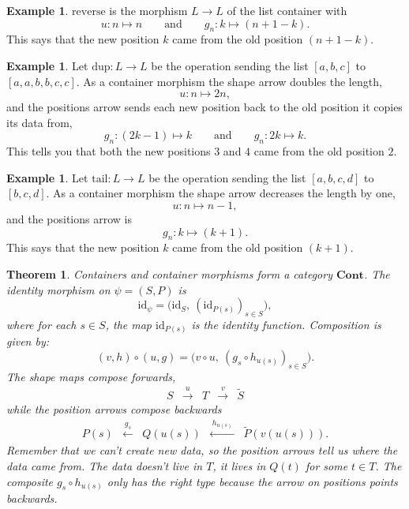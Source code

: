 \documentclass[11pt, a4paper]{article}
\theoremstyle{definition}
\newtheorem{example}[definition]{Example}
\theoremstyle{plain}
\newtheorem{theorem}[definition]{Theorem}
\begin{document}
\begin{example}\label{ex:reverse}
$\mathrm{reverse}$ is the morphism $L \to L$ of the list container with
\[
  u : n \mapsto n
  \qquad\text{and}\qquad
  g_n : k \mapsto (n + 1 - k).
\]
This says that the new position $k$ came from the old position
$(n + 1 - k)$.
\end{example}

\begin{example}\label{ex:dup}
Let $\mathrm{dup} : L \to L$ be the operation sending the list
$[a, b, c]$ to $[a, a, b, b, c, c]$.  As a container morphism the
shape arrow doubles the length,
\[
  u : n \mapsto 2n,
\]
and the positions arrow sends each new position back to the old
position it copies its data from,
\[
  g_n : (2k - 1) \mapsto k
  \qquad\text{and}\qquad
  g_n : 2k \mapsto k.
\]
This tells you that both the new positions $3$ and $4$ came from the old
position $2$.
\end{example}

\begin{example}\label{ex:tail}
Let $\mathrm{tail} : L \to L$ be the operation sending the list
$[a, b, c, d]$ to $[b, c, d]$.  As a container morphism the shape arrow
decreases the length by one,
\[
  u : n \mapsto n - 1,
\]
and the positions arrow is
\[
  g_n : k \mapsto (k + 1).
\]
This says that the new position $k$ came from the old position
$(k+1)$.
\end{example}

\noindent\colorbox{gray!15}{\parbox{\dimexpr\linewidth-2\fboxsep}{%
\begin{theorem}\label{thm:cont-category}
Containers and container morphisms form a category $\mathbf{Cont}$.
The identity morphism on $\psi = (S, P)$ is
\[
  \mathrm{id}_\psi = \bigl(\mathrm{id}_S,\ (\mathrm{id}_{P(s)})_{s \in S}\bigr),
\]
where for each $s \in S$, the map $\mathrm{id}_{P(s)}$ is the
identity function.  Composition is given by:
\[
  (v, h) \circ (u, g)
  = \bigl(v \circ u,\ (g_s \circ h_{u(s)})_{s \in S}\bigr).
\]
The shape maps compose \emph{forwards},
\[
\begin{array}{ccccc}
  S & \xrightarrow{\;u\;} & T & \xrightarrow{\;v\;} & \tilde{S}
\end{array}
\]
while the position arrows compose \emph{backwards}
\[
\begin{array}{ccccc}
  P(s) & \xleftarrow{\;g_s\;} & Q(u(s))
       & \xleftarrow{\;h_{u(s)}\;} & \tilde{P}(v(u(s))).
\end{array}
\]
Remember that we can't create new data, so the position arrows tell
us where the data came from.  The data doesn't live in $T$, it
lives in $Q(t)$ for some $t \in T$.
The composite $g_s \circ h_{u(s)}$ only has the right
type because the arrow on positions points backwards.
\end{theorem}%
}}
\end{document}
